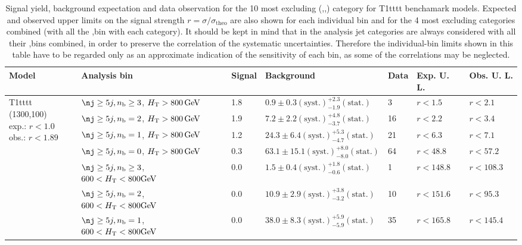 \clearpage
\begin{table}[h!] 
  \scriptsize
  \caption{ 
  Signal yield, background expectation and data observation for the 10 most excluding (\nj,\nb,\scalht) category for T1tttt benchamark models. 
  Expected and observed upper limits on the signal strength $r=\sigma/\sigma_{\mathrm{theo}}$ are also shown 
  for each individual bin and for the 4 most excluding \nj categories combined (with all the \nb,\scalht bin with each category).
  It should be kept in mind that in the analysis jet categories are always considered with all their \nb,\scalht bins 
  combined, in order to preserve the correlation of the systematic uncertainties. 
  Therefore the individual-bin limits shown in this table have to be regarded only as an approximate indication 
  of the sensitivity of each bin, as some of the correlations may be neglected.
  \label{tab:sigBenchmarksYields_T1tttt}}
  \centering 
  \begin{tabular}{ lllllll } 
    \hline 
    \hline 
    Model & Analysis bin & Signal & Background & Data & Exp. U. L. & Obs. U. L. \\ \hline
\multirow{10}{*}{\parbox[t]{2cm}{T1tttt (1300,100)\\exp.: $r<1.0$\\obs.: $r<1.89$}}
 & $\nj \geq5j,\nb \geq3$, $H_{\mathrm{T}} > 800 \, \mathrm{GeV}$ & 1.8 & $0.9 \pm 0.3 \mathrm{(syst.)} ^{+2.3}_{-1.9} \mathrm{(stat.)}$ & 3 & $r < 1.5$ & $r < 2.1$\\ 
 & $\nj \geq5j,\nb =2$, $H_{\mathrm{T}} > 800 \, \mathrm{GeV}$ & 1.9 & $7.2 \pm 2.2 \mathrm{(syst.)} ^{+4.8}_{-3.7} \mathrm{(stat.)}$ & 16 & $r < 2.2$ & $r < 3.4$\\ 
 & $\nj \geq5j,\nb =1$, $H_{\mathrm{T}} > 800 \, \mathrm{GeV}$ & 1.2 & $24.3 \pm 6.4 \mathrm{(syst.)} ^{+5.3}_{-4.7} \mathrm{(stat.)}$ & 21 & $r < 6.3$ & $r < 7.1$\\ 
 & $\nj \geq5j,\nb =0$, $H_{\mathrm{T}} > 800 \, \mathrm{GeV}$ & 0.3 & $63.1 \pm 15.1 \mathrm{(syst.)} ^{+8.0}_{-8.0} \mathrm{(stat.)}$ & 64 & $r < 48.8$ & $r < 57.2$\\ 
 & $\nj \geq5j,\nb \geq3$, $600 < H_{\mathrm{T}} < 800 \mathrm{GeV}$ & 0.0 & $1.5 \pm 0.4 \mathrm{(syst.)} ^{+1.8}_{-0.6} \mathrm{(stat.)}$ & 1 & $r < 148.8$ & $r < 108.3$\\ 
 & $\nj \geq5j,\nb =2$, $600 < H_{\mathrm{T}} < 800 \mathrm{GeV}$ & 0.0 & $10.9 \pm 2.9 \mathrm{(syst.)} ^{+3.8}_{-3.2} \mathrm{(stat.)}$ & 10 & $r < 151.6$ & $r < 95.3$\\ 
 & $\nj \geq5j,\nb =1$, $600 < H_{\mathrm{T}} < 800 \mathrm{GeV}$ & 0.0 & $38.0 \pm 8.3 \mathrm{(syst.)} ^{+5.9}_{-5.9} \mathrm{(stat.)}$ & 35 & $r < 165.8$ & $r < 145.4$\\ 

\end{tabular}
\end{table}
